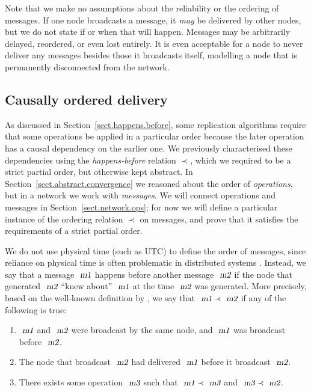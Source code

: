 Note that we make no assumptions about the reliability or the ordering of messages.
If one node broadcasts a message, it \emph{may} be delivered by other nodes, but we do not state if or when that will happen.
Messages may be arbitrarily delayed, reordered, or even lost entirely.
It is even acceptable for a node to never deliver any messages besides those it broadcasts itself, modelling a node that is permanently disconnected from the network.

\subsection{Causally ordered delivery}\label{sect.network.causal}

As discussed in Section~\ref{sect.happens.before}, some replication algorithms require that some operations be applied in a particular order because the later operation has a causal dependency on the earlier one.
We previously characterised these dependencies using the \emph{happens-before} relation $\prec$, which we required to be a strict partial order, but otherwise kept abstract.
In Section~\ref{sect.abstract.convergence} we reasoned about the order of \emph{operations}, but in a network we work with \emph{messages}.
We will connect operations and messages in Section~\ref{sect.network.ops}; for now we will define a particular instance of the ordering relation $\prec$ on messages, and prove that it satisfies the requirements of a strict partial order.

We do not use physical time (such as UTC) to define the order of messages, since reliance on physical time is often problematic in distributed systems \cite{Sheehy:2015jm}.
Instead, we say that a message $\isa{m1}$ happens before another message $\isa{m2}$ if the node that generated $\isa{m2}$ ``knew about'' $\isa{m1}$ at the time $\isa{m2}$ was generated.
More precisely, based on the well-known definition by \citet{Lamport:1978jq}, we say that $\isa{m1}\prec\isa{m2}$ if any of the following is true:
\begin{enumerate}
\item $\isa{m1}$ and $\isa{m2}$ were broadcast by the same node, and $\isa{m1}$ was broadcast before $\isa{m2}$.
\item The node that broadcast $\isa{m2}$ had delivered $\isa{m1}$ before it broadcast $\isa{m2}$.
\item There exists some operation $\isa{m3}$ such that $\isa{m1} \prec \isa{m3}$ and $\isa{m3} \prec \isa{m2}$.
\end{enumerate}

